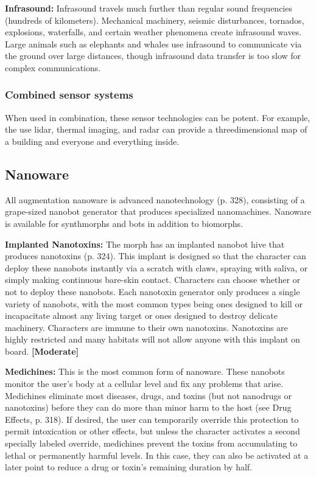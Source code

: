 \textbf{Infrasound:} Infrasound travels much further than regular sound frequencies (hundreds of kilometers). Mechanical machinery, seismic disturbances, tornados, explosions, waterfalls, and certain weather phenomena create infrasound waves. Large animals such as elephants and whales use infrasound to communicate via the ground over large distances, though infrasound data transfer is too slow for complex communications. 

\subsubsection{Combined sensor systems} 

When used in combination, these sensor technologies can be potent. For example, the use lidar, thermal imaging, and radar can provide a threedimensional map of a building and everyone and everything inside. 



\subsection{Nanoware} \label{sec:nanoware} 

All augmentation nanoware is advanced nanotechnology (p. 328), consisting of a grape-sized nanobot generator that produces specialized nanomachines. Nanoware is available for synthmorphs and bots in addition to biomorphs. 

\textbf{Implanted Nanotoxins:} The morph has an implanted nanobot hive that produces nanotoxins (p. 324). This implant is designed so that the character can deploy these nanobots instantly via a scratch with claws, spraying with saliva, or simply making continuous bare-skin contact. Characters can choose whether or not to deploy these nanobots. Each nanotoxin generator only produces a single variety of nanobots, with the most common types being ones designed to kill or incapacitate almost any living target or ones designed to destroy delicate machinery. Characters are immune to their own nanotoxins. Nanotoxins are highly restricted and many habitats will not allow anyone with this implant on board. \textbf{[Moderate]} 

\textbf{Medichines:} This is the most common form of nanoware. These nanobots monitor the user’s body at a cellular level and fix any problems that arise. Medichines eliminate most diseases, drugs, and toxins (but not nanodrugs or nanotoxins) before they can do more than minor harm to the host (see Drug Effects, p. 318). If desired, the user can temporarily override this protection to permit intoxication or other effects, but unless the character activates a second specially labeled override, medichines prevent the toxins from accumulating to lethal or permanently harmful levels. In this case, they can also be activated at a later point to reduce a drug or toxin’s remaining duration by half. 

